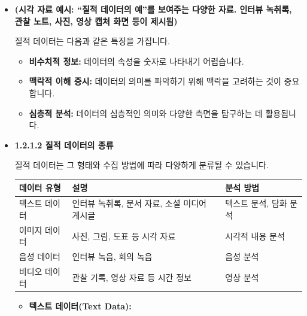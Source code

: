 \documentclass[
  letterpaper,
]{book}
\providecommand{\tightlist}{%
  \setlength{\itemsep}{0pt}\setlength{\parskip}{0pt}}
\begin{document}
\begin{itemize}
\item
  \textbf{(시각 자료 예시: ``질적 데이터의 예''를 보여주는 다양한 자료.
  인터뷰 녹취록, 관찰 노트, 사진, 영상 캡처 화면 등이 제시됨)}

  질적 데이터는 다음과 같은 특징을 가집니다.

  \begin{itemize}
  \tightlist
  \item
    \textbf{비수치적 정보:} 데이터의 속성을 숫자로 나타내기 어렵습니다.
  \item
    \textbf{맥락적 이해 중시:} 데이터의 의미를 파악하기 위해 맥락을
    고려하는 것이 중요합니다.
  \item
    \textbf{심층적 분석:} 데이터의 심층적인 의미와 다양한 측면을
    탐구하는 데 활용됩니다.
  \end{itemize}
\item
  \textbf{1.2.1.2 질적 데이터의 종류}

  질적 데이터는 그 형태와 수집 방법에 따라 다양하게 분류될 수 있습니다.

  \begin{longtable}[]{@{}
    >{\centering\arraybackslash}p{}
    >{\centering\arraybackslash}p{}
    >{\centering\arraybackslash}p{}@{}}
  \toprule\noalign{}
  \begin{minipage}[b]{\linewidth}\centering
  데이터 유형
  \end{minipage} & \begin{minipage}[b]{\linewidth}\centering
  설명
  \end{minipage} & \begin{minipage}[b]{\linewidth}\centering
  분석 방법
  \end{minipage} \\
  \midrule\noalign{}
  \endhead
  \bottomrule\noalign{}
  \endlastfoot
  텍스트 데이터 & 인터뷰 녹취록, 문서 자료, 소셜 미디어 게시글 & 텍스트
  분석, 담화 분석 \\
  이미지 데이터 & 사진, 그림, 도표 등 시각 자료 & 시각적 내용 분석 \\
  음성 데이터 & 인터뷰 녹음, 회의 녹음 & 음성 분석 \\
  비디오 데이터 & 관찰 기록, 영상 자료 등 시간 정보 & 영상 분석 \\
  \end{longtable}

  \begin{itemize}
  \tightlist
  \item
    \textbf{텍스트 데이터(Text Data):}


\end{itemize}
\end{itemize}
\end{document}
